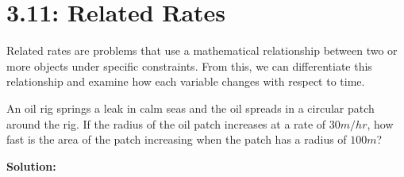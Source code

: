 \documentclass[mathNotesPreamble]{subfiles}
\begin{document}
\section{3.11: Related Rates}
  \begin{thmBox*}
    Related rates are problems that use a mathematical relationship between two or more objects under specific constraints. From this, we can differentiate this relationship and examine how each variable changes with respect to time.
  \end{thmBox*}

\begin{ex*}
  An oil rig springs a leak in calm seas and the oil spreads in a circular patch around the rig. If the radius of the oil patch increases at a rate of $30m/hr$, how fast is the area of the patch increasing when the patch has a radius of $100 m$?
\end{ex*}
\noindent
\textbf{Solution:}
\end{document}
